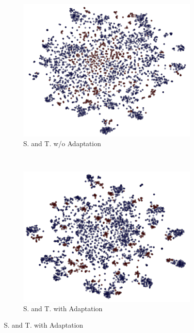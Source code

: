 \begin{figure}[ht]
    \begin{subfigure}[b]{0.5\textwidth}
        \includegraphics[width=\textwidth]{na_st.png}
        \caption{S. and T. w/o Adaptation}
        \label{fig:gull}
    \end{subfigure}~\begin{subfigure}[b]{0.5\textwidth}
        \includegraphics[width=\textwidth]{st.png}
        \caption{S. and T. with Adaptation}
        \label{fig:gull}
    \end{subfigure}


\end{figure}
